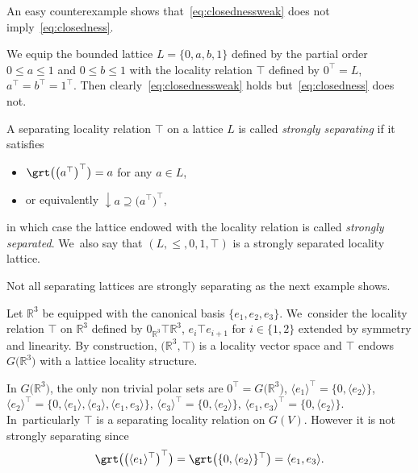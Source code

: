 \documentclass[10pt,a4paper]{amsart}
\numberwithin{equation}{section}
\newcommand{\R}{\mathbb{R}}
\newcommand{\loc}{locality\xspace}
\newcommand{\pone}{separating\xspace }
\def \ptwob {separated\xspace }
\begin{document}
An easy counterexample shows that~\eqref{eq:closednessweak} does not imply~\eqref{eq:closedness}.

\begin{coex}We equip the bounded lattice $L=\{0,a,b,1\}$ defined by the partial order $0\leq a\leq 1$ and $0\leq b\leq 1$ with the locality relation $\top$ defined by $0^\top=L$, $a^\top=b^\top=1^\top$. Then clearly~\eqref{eq:closednessweak} holds but~\eqref{eq:closedness} does not.\end{coex}
\begin{Definition}
A separating locality relation $\top$ on a lattice $L$ is called {\it strongly \pone} if it satisfies
	\begin{itemize}\itemsep=0pt	
\item [$(c)$]%
		$\grt\big(\big(a^\top\big)^\top\big)= a $ for any $a\in L$,
\item [$(c')$]%
or equivalently $\downarrow a\supseteq \big(a^\top\big)^\top $,
	\end{itemize}in which case the lattice endowed with the \loc relation is called {\it strongly \ptwob}. We~also say that $(L, \leq, 0, 1, \top) $ is a strongly separated locality lattice.
	\label{def:strongsplitlattice}
\end{Definition}
Not all separating lattices are strongly separating as the next example shows.
\begin{Example}
		Let $\R^3$ be equipped with the canonical basis $\{e_1,e_2,e_3\}$. We~consider the locality relation $\top$ on $\R^3$ defined by $0_{\R^3}\top\R^3$, $e_i\top e_{i+1}$ for $i\in \{1,2 \}$ extended by symmetry and linearity. By construction, $\big(\R^3,\top\big)$ is a locality vector space and $\top$ endows $G\big(\R^3\big)$ with a lattice locality structure.
		
In $G\big(\R^3\big)$, the only non trivial polar sets are $0^\top = G\big(\R^3\big)$,
$\langle e_1\rangle^\top = \{0,\langle e_2 \rangle\}$,
$\langle e_2\rangle^\top = \{0,\langle e_1\rangle,\langle e_3\rangle,\langle e_1, e_3\rangle\}$,
$\langle e_3\rangle^\top = \{0,\langle e_2 \rangle\}$,
$\langle e_1, e_3\rangle^\top =\{0, \langle e_2\rangle\}$. In~particularly $\top$ is a separating loca\-lity relation on $G(V)$. However it is not strongly separating since
\begin{gather*}
\grt\big(\big(\langle e_1\rangle^\top\big)^\top\big) = \grt\big(\{0, \langle e_2\rangle\}^\top\big)= \langle e_1, e_3\rangle.
\end{gather*}
\end{Example}
\end{document}
